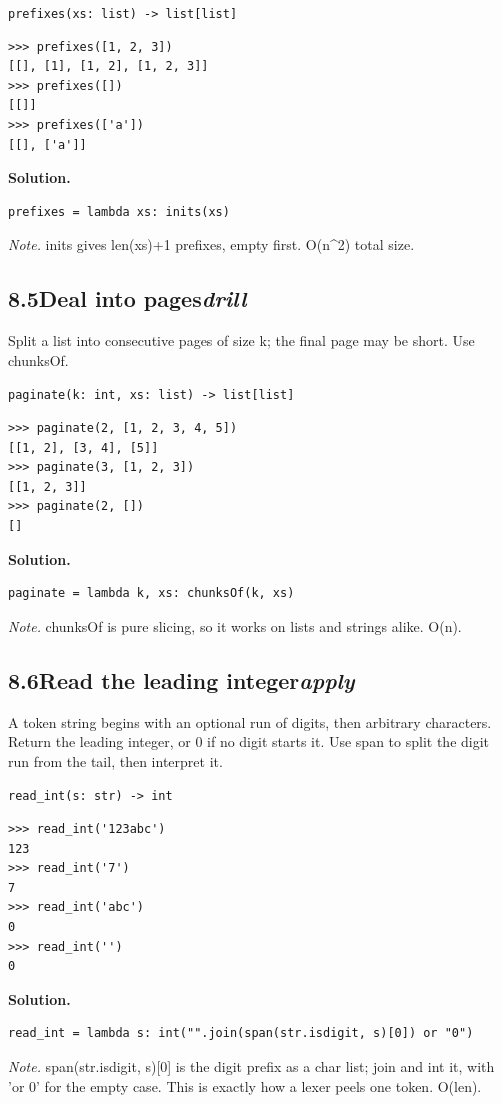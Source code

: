 \documentclass[10pt,letterpaper]{book}
\begin{document}
\noindent\texttt{prefixes(xs: list) -> list[list]}
\begin{lstlisting}[style=ex]
>>> prefixes([1, 2, 3])
[[], [1], [1, 2], [1, 2, 3]]
>>> prefixes([])
[[]]
>>> prefixes(['a'])
[[], ['a']]
\end{lstlisting}
\noindent\textbf{Solution.}
\begin{lstlisting}[style=code]
prefixes = lambda xs: inits(xs)
\end{lstlisting}
\noindent\textit{Note.} inits gives len(xs)+1 prefixes, empty first. O(n\^{}2) total size.

\subsection*{8.5\quad Deal into pages\hfill\textnormal{\textit{drill}}}
Split a list into consecutive pages of size k; the final page may be short. Use chunksOf.

\noindent\texttt{paginate(k: int, xs: list) -> list[list]}
\begin{lstlisting}[style=ex]
>>> paginate(2, [1, 2, 3, 4, 5])
[[1, 2], [3, 4], [5]]
>>> paginate(3, [1, 2, 3])
[[1, 2, 3]]
>>> paginate(2, [])
[]
\end{lstlisting}
\noindent\textbf{Solution.}
\begin{lstlisting}[style=code]
paginate = lambda k, xs: chunksOf(k, xs)
\end{lstlisting}
\noindent\textit{Note.} chunksOf is pure slicing, so it works on lists and strings alike. O(n).

\subsection*{8.6\quad Read the leading integer\hfill\textnormal{\textit{apply}}}
A token string begins with an optional run of digits, then arbitrary characters. Return the leading integer, or 0 if no digit starts it. Use span to split the digit run from the tail, then interpret it.

\noindent\texttt{read\_int(s: str) -> int}
\begin{lstlisting}[style=ex]
>>> read_int('123abc')
123
>>> read_int('7')
7
>>> read_int('abc')
0
>>> read_int('')
0
\end{lstlisting}
\noindent\textbf{Solution.}
\begin{lstlisting}[style=code]
read_int = lambda s: int("".join(span(str.isdigit, s)[0]) or "0")
\end{lstlisting}
\noindent\textit{Note.} span(str.isdigit, s)[0] is the digit prefix as a char list; join and int it, with 'or 0' for the empty case. This is exactly how a lexer peels one token. O(len).
\end{document}
